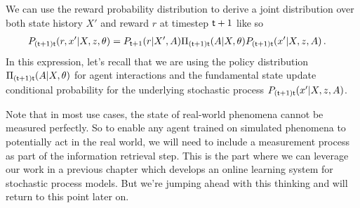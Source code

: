 We can use the reward probability distribution to derive a joint distribution over both state history $X'$ and reward $r$ at timestep ${\sf t}+1$ like so
\begin{align}
P_{({\sf t}+1){\sf t}}(r,x'\vert X, z,\theta) &= P_{{\sf t}+1}(r\vert X',A)\Pi_{({\sf t}+1){\sf t}}(A\vert X,\theta)P_{({\sf t}+1){\sf t}}(x'\vert X,z,A) \label{eq:joint-x-and-r}\,.
\end{align}
In this expression, let's recall that we are using the policy distribution $\Pi_{({\sf t}+1){\sf t}}(A\vert X,\theta)$ for agent interactions and the fundamental state update conditional probability for the underlying stochastic process $P_{({\sf t}+1){\sf t}}(x'\vert X,z,A)$.

Note that in most use cases, the state of real-world phenomena cannot be measured perfectly. So to enable any agent trained on simulated phenomena to potentially act in the real world, we will need to include a measurement process as part of the information retrieval step. This is the part where we can leverage our work in a previous chapter which develops an online learning system for stochastic process models. But we're jumping ahead with this thinking and will return to this point later on.

